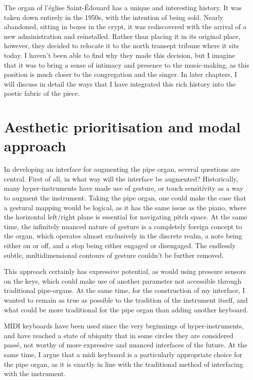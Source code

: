 \documentclass[12pt,twoside,maitrise]{dms_ks}
\theoremstyle{definition}
\begin{document}
{The organ of l'église Saint-Édouard has a unique and interesting history. 
It was taken down entirely in the 1950s, with the intention of being sold. 
Nearly abandoned, sitting in boxes in the crypt, it was rediscovered with the arrival of a new administration and reinstalled. 
Rather than placing it in its original place, however, they decided to relocate it to the north transept tribune where it sits today. 
I haven't been able to find why they made this decision, but I imagine that it was to bring a sense of intimacy and presence to the music-making, as this position is much closer to the congregation and the singer. 
In later chapters, I will discuss in detail the ways that I have integrated this rich history into the poetic fabric of the piece.

\section{Aesthetic prioritisation and modal approach}

In developing an interface for augmenting the pipe organ, several questions are central.
First of all, in what way will the interface be augmented?
Historically, many hyper-instruments have made use of gesture, or touch sensitivity as a way to augment the instrument.
Taking the pipe organ, one could make the case that a gestural mapping would be logical, as it has the same issue as the piano, where the horizontal left/right plane is essential for navigating pitch space.
At the same time, the infinitely nuanced nature of gesture is a completely foreign concept to the organ, which operates almost exclusively in the discrete realm, a note being either on or off, and a stop being either engaged or disengaged.
The endlessly subtle, multidimensional contours of gesture couldn't be further removed.

This approach certainly has expressive potential, as would using pressure sensors on the keys, which could make use of another parameter not accessible through traditional pipe-organs.
At the same time, for the construction of my interface, I wanted to remain as true as possible to the tradition of the instrument itself, and what could be more traditional for the pipe organ than adding another keyboard.

MIDI keyboards have been used since the very beginnings of hyper-instruments, and have reached a state of ubiquity that in some circles they are considered passé, not worthy of more expressive and nuanced interfaces of the future.
At the same time, I argue that a midi keyboard is a particularly appropriate choice for the pipe organ, as it is exactly in line with the traditional method of interfacing with the instrument.

}
\end{document}
